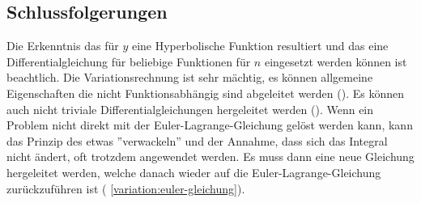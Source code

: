  \subsection{Schlussfolgerungen}
 Die Erkenntnis das für $y$ eine Hyperbolische Funktion resultiert und das eine Differentialgleichung für beliebige Funktionen für $n$ eingesetzt werden können ist beachtlich. Die Variationsrechnung ist sehr mächtig, es können allgemeine Eigenschaften die nicht Funktionsabhängig sind abgeleitet werden (). Es können auch nicht triviale Differentialgleichungen hergeleitet werden (). Wenn ein Problem nicht direkt mit der Euler-Lagrange-Gleichung gelöst werden kann, kann das Prinzip des etwas ''verwackeln'' und der Annahme, dass sich das Integral nicht ändert, oft trotzdem angewendet werden. Es muss dann eine neue Gleichung hergeleitet werden, welche danach wieder auf die Euler-Lagrange-Gleichung zurückzuführen ist ( \eqref{variation:euler-gleichung}).